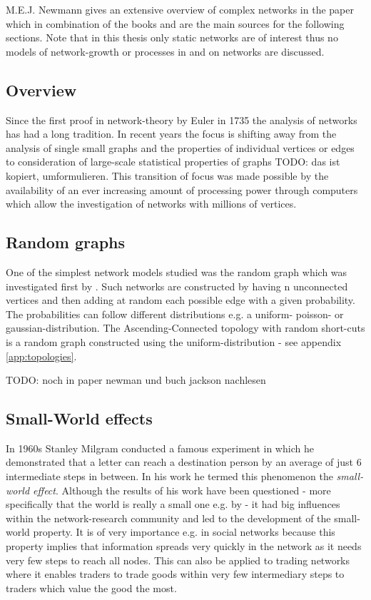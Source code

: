 \documentclass[../Bachelorarbeit.tex]{subfiles}
\begin{document}
M.E.J. Newmann gives an extensive overview of complex networks in the paper \cite{Newman_ComplexNetworks} which in combination of the books \cite{Jackson2008} and \cite{Easley2010} are the main sources for the following sections. Note that in this thesis only static networks are of interest thus no models of network-growth or processes in and on networks are discussed.

\subsection{Overview}
Since the first proof in network-theory by Euler in 1735 the analysis of networks has had a long tradition. In recent years the focus is shifting away from the analysis of single small graphs and the properties of individual vertices or edges to consideration of large-scale statistical properties of graphs TODO: das ist kopiert, umformulieren. This transition of focus was made possible by the availability of an ever increasing amount of processing power through computers which allow the investigation of networks with millions of vertices.

\subsection{Random graphs}
One of the simplest network models studied was the random graph which was investigated first by \cite{ErdosRenyi_RandomGraphs}. Such networks are constructed by having n unconnected vertices and then adding at random each possible edge with a given probability. The probabilities can follow different distributions e.g. a uniform- poisson- or gaussian-distribution. The Ascending-Connected topology with random short-cuts is a random graph constructed using the uniform-distribution - see appendix \ref{app:topologies}. 

TODO: noch in paper newman und buch jackson nachlesen

\subsection{Small-World effects}
In 1960s Stanley Milgram conducted a famous experiment in which he demonstrated that a letter can reach a destination person by an average of just 6 intermediate steps in between. In his work \cite{TraverMilgram_StudySmallWorld} \citep{Milgram_SmallWorld} he termed this phenomenon the \textit{small-world effect}. Although the results of his work have been questioned - more specifically that the world is really a small one e.g. by \cite{Kleinfeld_BigWorld} - it had big influences within the network-research community and led to the development of the small-world property. It is of very importance e.g. in social networks because this property implies that information spreads very quickly in the network as it needs very few steps to reach all nodes. This can also be applied to trading networks where it enables traders to trade goods within very few intermediary steps to traders which value the good the most.
\end{document}
